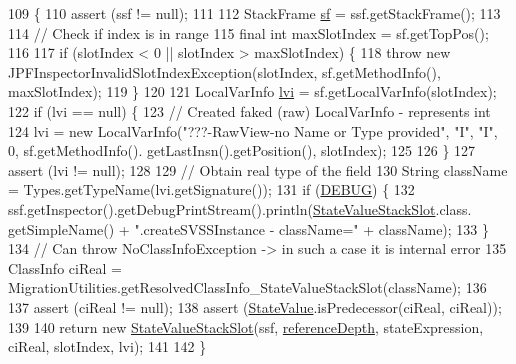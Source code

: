 \begin{DoxyCode}
109                                                    \{
110     assert (ssf != null);
111 
112     StackFrame \hyperlink{classgov_1_1nasa_1_1jpf_1_1inspector_1_1server_1_1programstate_1_1_state_value_stack_slot_afc660da35cfea1fff267b7b97be87321}{sf} = ssf.getStackFrame();
113 
114     \textcolor{comment}{// Check if index is in range}
115     \textcolor{keyword}{final} \textcolor{keywordtype}{int} maxSlotIndex = sf.getTopPos();
116 
117     \textcolor{keywordflow}{if} (slotIndex < 0 || slotIndex > maxSlotIndex) \{
118       \textcolor{keywordflow}{throw} \textcolor{keyword}{new} JPFInspectorInvalidSlotIndexException(slotIndex, sf.getMethodInfo(), maxSlotIndex);
119     \}
120 
121     LocalVarInfo \hyperlink{classgov_1_1nasa_1_1jpf_1_1inspector_1_1server_1_1programstate_1_1_state_value_stack_slot_a3f0fe3589b9a0511defcdce9502be964}{lvi} = sf.getLocalVarInfo(slotIndex);
122     \textcolor{keywordflow}{if} (lvi == null) \{
123       \textcolor{comment}{// Created faked (raw) LocalVarInfo - represents int}
124       lvi = \textcolor{keyword}{new} LocalVarInfo(\textcolor{stringliteral}{"???-RawView-no Name or Type provided"}, \textcolor{stringliteral}{"I"}, \textcolor{stringliteral}{"I"}, 0, sf.getMethodInfo().
      getLastInsn().getPosition(), slotIndex);
125 
126     \}
127     assert (lvi != null);
128 
129     \textcolor{comment}{// Obtain real type of the field}
130     String className = Types.getTypeName(lvi.getSignature());
131     \textcolor{keywordflow}{if} (\hyperlink{classgov_1_1nasa_1_1jpf_1_1inspector_1_1server_1_1programstate_1_1_state_value_stack_slot_a534b308e096f779c363e5970565f4e1a}{DEBUG}) \{
132       ssf.getInspector().getDebugPrintStream().println(\hyperlink{classgov_1_1nasa_1_1jpf_1_1inspector_1_1server_1_1programstate_1_1_state_value_stack_slot_a6addc1cee4ec49c656f1fcaa7b8d919d}{StateValueStackSlot}.class.
      getSimpleName() + \textcolor{stringliteral}{".createSVSSInstance - className="} + className);
133     \}
134     \textcolor{comment}{// Can throw NoClassInfoException -> in such a case it is internal error}
135     ClassInfo ciReal = MigrationUtilities.getResolvedClassInfo\_StateValueStackSlot(className);
136 
137     assert (ciReal != null);
138     assert (\hyperlink{classgov_1_1nasa_1_1jpf_1_1inspector_1_1server_1_1programstate_1_1_state_value_aef9d3691f1dd70f6458c47ce8bc6943c}{StateValue}.isPredecessor(ciReal, ciReal));
139 
140     \textcolor{keywordflow}{return} \textcolor{keyword}{new} \hyperlink{classgov_1_1nasa_1_1jpf_1_1inspector_1_1server_1_1programstate_1_1_state_value_stack_slot_a6addc1cee4ec49c656f1fcaa7b8d919d}{StateValueStackSlot}(ssf, \hyperlink{classgov_1_1nasa_1_1jpf_1_1inspector_1_1server_1_1programstate_1_1_state_node_a55683618625dae46e8aa68d95811d6bb}{referenceDepth}, stateExpression, 
      ciReal, slotIndex, lvi);
141 
142   \}
\end{DoxyCode}
